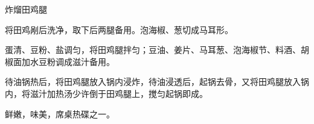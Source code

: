 %
%
%
%
%
%
%
\begin{recipe}{炸熘田鸡腿}

\ingredients


\preparation

\step 将田鸡剐后洗净，取下后两腿备用。泡海椒、葱切成马耳形。

\step 蛋清、豆粉、盐调匀，将田鸡腿拌匀；豆油、姜片、马耳葱、泡海椒节、料酒、胡
椒面加水豆粉调成滋汁备用。

\step 待油锅热后，将田鸡腿放入锅内浸炸，待油浸透后，起锅去骨，又将田鸡腿放入锅
内，将滋汁加热汤少许倒于田鸡腿上，搅匀起锅即成。

\features

鲜嫩，味美，席桌热碟之一。

\end{recipe}

